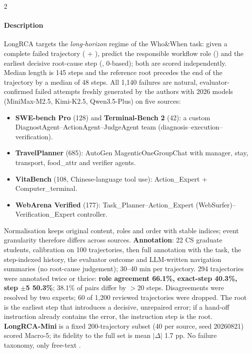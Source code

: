 \begin{multicols}{2}
\paragraph{Description} LongRCA targets the \emph{long-horizon} regime of the Who\&When task: given a complete failed trajectory ( + ), predict the responsible workflow role () and the earliest decisive root-cause step (, 0-based); both are scored independently. Median length is 145 steps and the reference root precedes the end of the trajectory by a median of 48 steps. All 1,140 failures are natural, evaluator-confirmed failed attempts freshly generated by the authors with 2026 models (MiniMax-M2.5, Kimi-K2.5, Qwen3.5-Plus) on five sources:
\begin{itemize}
\item \textbf{SWE-bench Pro} (128) and \textbf{Terminal-Bench 2} (42): a custom DiagnostAgent--ActionAgent--JudgeAgent team (diagnosis--execution--verification).
\item \textbf{TravelPlanner} (685): AutoGen MagenticOneGroupChat with manager, stay, transport, food\_attr and verifier agents.
\item \textbf{VitaBench} (108, Chinese-language tool use): Action\_Expert + Computer\_terminal.
\item \textbf{WebArena Verified} (177): Task\_Planner--Action\_Expert (WebSurfer)--Verification\_Expert controller.
\end{itemize}
Normalisation keeps original content, roles and order with stable indices; event granularity therefore differs across sources. \textbf{Annotation}: 22 CS graduate students, calibration on 100 trajectories, then full annotation with the task, the step-indexed history, the evaluator outcome and LLM-written navigation summaries (no root-cause judgement); 30--40 min per trajectory. 294 trajectories were annotated twice or thrice: \textbf{role agreement 66.1\%, exact-step 40.3\%, step $\pm$5 50.3\%}; 38.1\% of pairs differ by $>$20 steps. Disagreements were resolved by two experts; 60 of 1,200 reviewed trajectories were dropped. The root is the earliest step that introduces a decisive, unrepaired error; if a hand-off instruction already contains the error, the instruction step is the root. \textbf{LongRCA-Mini} is a fixed 200-trajectory subset (40 per source, seed 20260821) scored Macro-5; its fidelity to the full set is mean $|\Delta|$ 1.7 pp. No failure taxonomy, only free-text .


\end{multicols}
